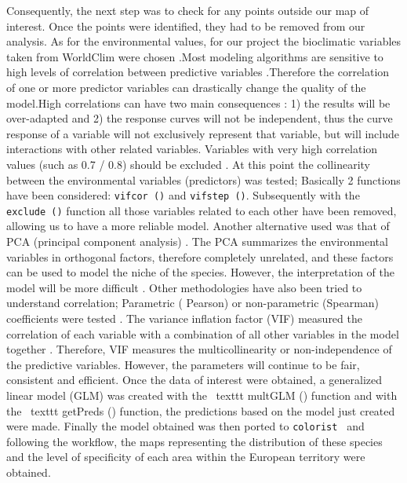 \documentclass[12pt,a4paper]{article}
\begin{document}
Consequently, the next step was to check for any points outside our map of interest.
Once the points were identified, they had to be removed from our analysis.
As for the environmental values, for our project the bioclimatic variables taken from WorldClim were chosen \citep{bcw}.Most modeling algorithms are sensitive to high levels of correlation between predictive variables \citep{dor13}.Therefore the correlation of one or more predictor variables can drastically change the quality of the model.High correlations can have two main consequences \citep{dor13}\citep{demn}:
1) the results will be over-adapted and 2) the response curves will not be independent, thus the curve response of a variable will not exclusively represent that variable, but will include interactions with other related variables.
Variables with very high correlation values (such as 0.7 / 0.8) should be excluded \citep{dor13}.
At this point the collinearity between the environmental variables (predictors) was tested; Basically 2 functions have been considered: \texttt{vifcor ()} and \texttt{vifstep ()}.
Subsequently with the \texttt{exclude ()} function all those variables related to each other have been removed, allowing us to have a more reliable model.
Another alternative used was that of PCA (principal component analysis) \citep{pere}.
The PCA summarizes the environmental variables in orthogonal factors, therefore completely unrelated, and these factors can be used to model the niche of the species. However, the interpretation of the model will be more difficult \citep{sil}. 
Other methodologies have also been tried to understand correlation; Parametric ( Pearson) or non-parametric (Spearman) coefficients were tested \citep{fiel}.
The variance inflation factor (VIF) measured the correlation of each variable with a combination of all other variables in the model together \citep{dor13}. Therefore, VIF measures the multicollinearity or non-independence of the predictive variables. However, the parameters will continue to be fair, consistent and efficient.
Once the data of interest were obtained, a generalized linear model (GLM) was created with the \ texttt {multGLM ()} function and with the \ texttt {getPreds ()} function, the predictions based on the model just created were made.
Finally the model obtained was then ported to \texttt{colorist } and following the workflow, the maps representing the distribution of these species and the level of specificity of each area within the European territory were obtained. 
\end{document}
